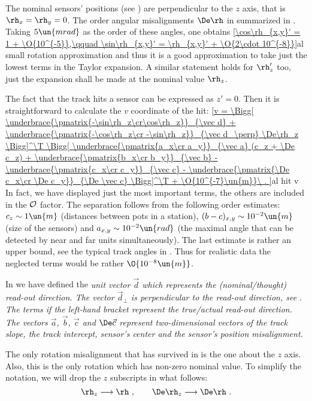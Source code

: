 The nominal sensors' positions (see ) are perpendicular to the $z$ axis, that is $\rh_x=\rh_y=0$. The order angular misalignments $\De\rh$ in summarized in . Taking $5\un{mrad}$ as the order of these angles, one obtains
\eqref{\cos\rh_{x,y}' = 1 + \O{10^{-5}},\qquad \sin\rh_{x,y}' = \rh_{x,y}' + \O{2\cdot 10^{-8}}}{al small rotation approximation}
and thus it is a good approximation to take just the lowest terms in the Taylor expansion. A similar statement holds for $\rh_z'$ too, just the expansion shall be made at the nominal value $\rh_z$.

The fact that the track  hits a sensor can be expressed as $z' = 0$. Then it is straightforward to calculate the $v$ coordinate of the hit:
\eqref{v =
	\Bigg[
		\underbrace{\pmatrix{-\sin\rh_z\cr\cos\rh_z}}_{\vec d}
		+ \underbrace{\pmatrix{-\cos\rh_z\cr -\sin\rh_z}}_{\vec d_\perp} \De\rh_z
	\Bigg]^\T
	\Bigg[
		\underbrace{\pmatrix{a_x\cr a_y}}_{\vec a} (c_z + \De c_z)
		 + \underbrace{\pmatrix{b_x\cr b_y}}_{\vec b}
		 - \underbrace{\pmatrix{c_x\cr c_y}}_{\vec c}
		 - \underbrace{\pmatrix{\De c_x\cr \De c_y}}_{\De \vec c}
	\Bigg]^\T
	+ \O{10^{-7}\un{m}}\ .
}{al hit v}
In fact, we have displayed just the most important terms, the others are included in the $\cal O$ factor. The separation follows from the following order estimates: $c_z \sim 1\un{m}$ (distances between pots in a station), $(b - c)_{x, y} \sim 10^{-2}\un{m}$ (size of the sensors) and $a_{x, y} \sim 10^{-2}\un{rad}$ (the maximal angle that can be detected by near and far units simultaneously). The last estimate is rather an upper bound, see the typical track angles in . Thus for realistic data the neglected terms would be rather $\O{10^{-8}\un{m}}$.

In  we have defined the \em{unit} vector $\vec d$ which represents the (nominal/thought) \em{read-out direction}. The vector $\vec d_\perp$ is perpendicular to the read-out direction, see . The terms if the left-hand bracket represent the true/actual read-out direction. The vectors $\vec a$, $\vec b$, $\vec c$ and $\De \vec c$ represent two-dimensional vectors of the track slope, the track intercept, sensor's center and the sensor's position misalignment.

The only rotation misalignment that has survived in  is the one about the $z$ axis. Also, this is the only rotation which has non-zero nominal value. To simplify the notation, we will drop the $z$ subscripts in what follows:
$$\rh_z \longrightarrow \rh\ ,\qquad \De\rh_z \longrightarrow \De\rh\ .$$

